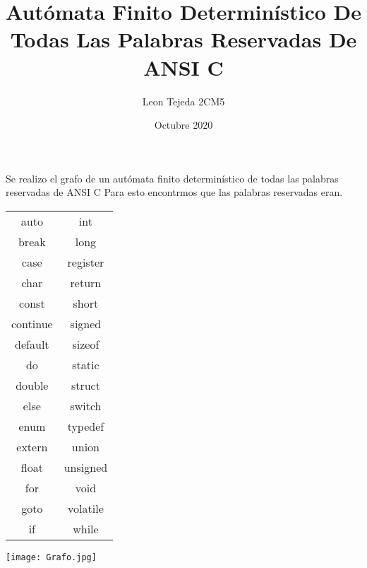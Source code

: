 \documentclass{article}
\title{Autómata Finito Determinístico De Todas Las Palabras Reservadas De ANSI C}
\author{Leon Tejeda 2CM5}
\date{Octubre 2020}
\begin{document}
\maketitle
Se realizo el grafo de un autómata finito determinístico de todas las palabras reservadas de ANSI C
Para esto encontrmos que las palabras reservadas eran.

\centering
\begin{tabular}{c c}
auto		&	int \\
break		&	long \\
case		&	register \\
char		&	return \\
const		&	short \\
continue	&	signed \\
default	&	sizeof \\
do		&	static \\
double	&	struct \\
else		&	switch \\
enum		&	typedef \\
extern	&	union \\
float		&	unsigned \\
for		&	void \\
goto		&	volatile \\
if		&	while \\
\end{tabular}


\texttt{[image: Grafo.jpg]}
\end{document}
